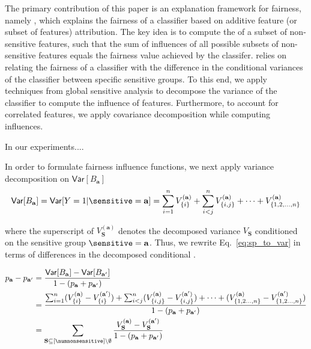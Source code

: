 The primary contribution of this paper is an explanation framework for fairness, namely {\framework}, which explains the fairness of a classifier based on additive feature (or subset of features) attribution. The key idea is to compute the \emph{} of a subset of non-sensitive features, such that the sum of influences of all possible subsets of non-sensitive features equals the fairness value achieved by the classifer. {\framework} relies on relating the fairness of a classifier with the difference in the conditional variances of the classifier between specific sensitive groups. To this end, we apply techniques from global sensitive analysis to decompose the variance of the classifier to compute the influence of features. Furthermore, to account for correlated features, we apply covariance decomposition while computing influences. 

In our experiments.... 



\noindent\makebox[\textwidth]{\rule{\textwidth}{2pt}}



In order to formulate fairness influence functions, we next apply variance decomposition on $ \mathsf{Var}[B_{\mathbf{a}}] $
\begin{align}
\mathsf{Var}[B_\mathbf{a}] = \mathsf{Var}[Y=1|\sensitive = \mathbf{a}] =  \sum_{i=1}^{n}V_{\{i\}}^{(\mathbf{a})} +  \sum_{i<j}^{n} V_{\{i,j\}}^{(\mathbf{a})}  + \cdots  + V_{\{1,2,\dots,n\}}^{(\mathbf{a})}
\end{align}

where the superscript of $ V_{\mathbf{S}}^{(\mathbf{a})} $ denotes the decomposed variance $ V_{\mathbf{S}} $ conditioned on the sensitive group $ \sensitive = \mathbf{a} $.  Thus, we rewrite Eq.~\ref{eq:sp_to_var} in terms of differences in the decomposed conditional . 

\begin{align}
p_\mathbf{a} -  p_\mathbf{a'}  &= \frac{	\mathsf{Var}[B_\mathbf{a}] - \mathsf{Var}[B_\mathbf{a'}]}{1 - (p_\mathbf{a} + p_\mathbf{a'})}\notag \\ 
&= \frac{\sum_{i=1}^{n} (V_{\{i\}}^{(\mathbf{a})} - V_{\{i\}}^{(\mathbf{a'})})+  \sum_{i<j}^{n} (V_{\{i,j\}}^{(\mathbf{a})} - V_{\{i,j\}}^{(\mathbf{a'})})  + \cdots  + (V_{\{1,2\dots,n\}}^{(\mathbf{a})} - V_{\{1,2\dots,n\}}^{(\mathbf{a'})})}{1 - (p_\mathbf{a} + p_\mathbf{a'})} \notag \\
&= \sum_{\mathbf{S} \subseteq [\numnonsensitive] \setminus \emptyset} \frac{V_{\mathbf{S}}^{(\mathbf{a})} - V_{\mathbf{S}}^{(\mathbf{a'})}}{1 - (p_\mathbf{a} + p_\mathbf{a'})} \label{eq:influence_value}
\end{align}

